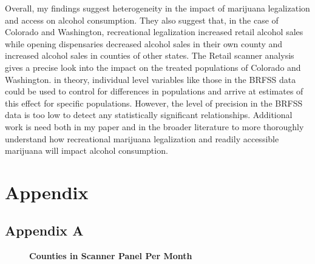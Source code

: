 \documentclass[11pt]{article}
\begin{document}
Overall, my findings suggest heterogeneity in the impact of marijuana legalization and access on alcohol consumption. They also suggest that, in the case of Colorado and Washington, recreational legalization increased retail alcohol sales while opening dispensaries decreased alcohol sales in their own county and increased alcohol sales in counties of other states. The Retail scanner analysis gives a precise look into the impact on the treated populations of Colorado and Washington. in theory, individual level variables like those in the BRFSS data could be used to control for differences in populations and arrive at estimates of this effect for specific populations. However, the level of precision in the BRFSS data is too low to detect any statistically significant relationships. Additional work is need both in my paper and in the broader literature to more thoroughly understand how recreational marijuana legalization and readily accessible marijuana will impact alcohol consumption. 
 





\section{Appendix}

\subsection{Appendix A}

\begin{figure}[H]
	\centering
	\LARGE{\textbf{Counties in Scanner Panel Per Month}}\par\medskip
	\scalebox{.6}{
	
}
	\scalebox{.6}{
	
}
\end{figure}


\end{document}
